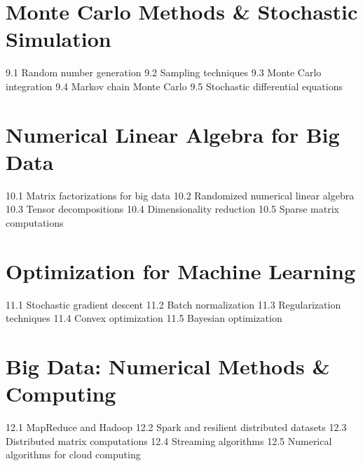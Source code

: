 \section{Monte Carlo Methods \& Stochastic Simulation}
9.1 Random number generation
9.2 Sampling techniques
9.3 Monte Carlo integration
9.4 Markov chain Monte Carlo
9.5 Stochastic differential equations
\section{Numerical Linear Algebra for Big Data}
10.1 Matrix factorizations for big data
10.2 Randomized numerical linear algebra
10.3 Tensor decompositions
10.4 Dimensionality reduction
10.5 Sparse matrix computations
\section{Optimization for Machine Learning}
11.1 Stochastic gradient descent
11.2 Batch normalization
11.3 Regularization techniques
11.4 Convex optimization
11.5 Bayesian optimization
\section{Big Data: Numerical Methods \& Computing}
12.1 MapReduce and Hadoop
12.2 Spark and resilient distributed datasets
12.3 Distributed matrix computations
12.4 Streaming algorithms
12.5 Numerical algorithms for cloud computing

